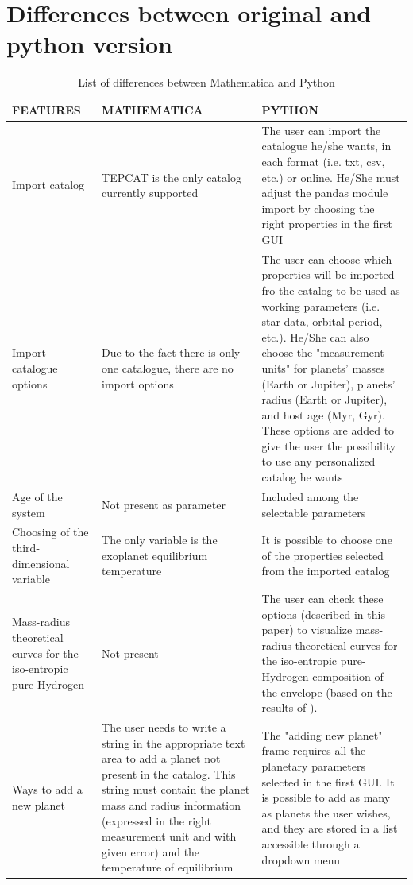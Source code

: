 \documentclass[fleqn,10pt]{SelfArx} %
\begin{document}
    \section{Differences between original and python version}
     	\begin{center}
    		\centering
    		\begin{longtable}{|p{5.5cm}|p{5cm}|p{6cm}|}
    			\caption{List of differences between Mathematica and Python}
    			\label{table:table_argument}
    			\endfirsthead
    			\endhead
    			\hline
    			\textbf{FEATURES} & \textbf{MATHEMATICA} & \textbf{PYTHON} \\ [0.5ex]
    			\hline\hline
    			Import catalog & TEPCAT is the only catalog currently supported & The user can import the catalogue he/she wants, in each format (i.e. txt, csv, etc.) or online. He/She must adjust the pandas module import by choosing the right properties in the first GUI \\
    			\hline
    			Import catalogue options & Due to the fact there is only one catalogue, there are no import options & The user can choose which properties will be imported fro the catalog to be used as working parameters (i.e. star data, orbital period, etc.). He/She can also choose the "measurement units" for planets' masses (Earth or Jupiter), planets' radius (Earth or Jupiter), and host age (Myr, Gyr). These options are added to give the user the possibility to use any personalized catalog he wants \\
    			\hline
    			Age of the system & Not present as parameter & Included among the selectable parameters \\
    			\hline
    			Choosing of the third-dimensional variable & The only variable is the exoplanet equilibrium temperature & It is possible to choose one of the properties selected from the imported catalog \\
    			\hline
    			Mass-radius theoretical curves for the iso-entropic pure-Hydrogen & Not present & The user can check these options (described in this paper) to visualize mass-radius theoretical curves for the iso-entropic pure-Hydrogen composition of the envelope (based on the results of \textit{\cite{Becker2014}}). \\
    			\hline
    			Ways to add a new planet & The user needs to write a string in the appropriate text area to add a planet not present in the catalog. This string must contain the planet mass and radius information (expressed in the right measurement unit and with given error) and the temperature of equilibrium & The "adding new planet" frame requires all the planetary parameters selected in the first GUI. It is possible to add as many as planets the user wishes, and they are stored in a list accessible through a dropdown menu \\
    			\hline
    		\end{longtable}
    	\end{center}
\end{document}

